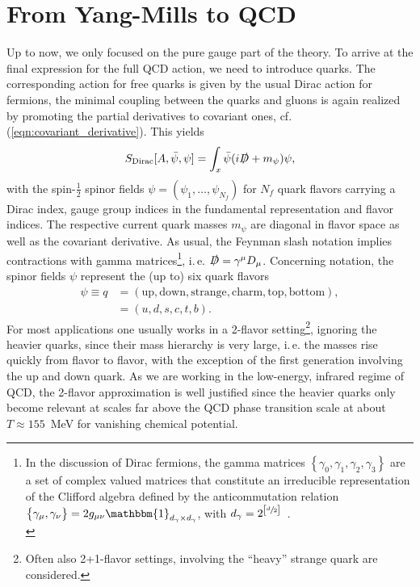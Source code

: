 \section{From Yang-Mills to QCD}\label{sec:ym_to_qcd}
Up to now, we only focused on the pure gauge part of the theory. To arrive at the final expression for the full QCD action, we need to introduce quarks. The corresponding action for free quarks is given by the usual Dirac action for fermions, the minimal coupling between the quarks and gluons is again realized by promoting the partial derivatives to covariant ones, cf. (\ref{eqn:covariant_derivative}). This yields
\begin{equation}
S_{\mathrm{Dirac}}[A,\bar{\psi},\psi]=\int_x \bar{\psi}(i\slashed{D} + m_{\psi}) \psi,
\end{equation}
with the spin-$\frac{1}{2}$ spinor fields $\psi = (\psi_1, \dots, \psi_{N_f})$ for $N_f$ quark flavors carrying a Dirac index, gauge group indices in the fundamental representation and flavor indices. The respective current quark masses $m_{\psi}$ are diagonal in flavor space as well as the covariant derivative. As usual, the Feynman slash notation implies contractions with gamma matrices\footnote{In the discussion of Dirac fermions, the gamma matrices $\left\{\gamma_0, \gamma_1, \gamma_2, \gamma_3\right\}$ are a set of complex valued matrices that constitute an irreducible representation of the Clifford algebra  defined by the anticommutation relation $\left\{\gamma_{\mu}, \gamma_{\nu}\right\}= 2g_{\mu\nu} \mathbbm{1}_{d_{\gamma}\times d_{\gamma}}$, with $d_{\gamma} = 2^{\left[\sfrac{d}{2}\right]}$\ \cite{PeskinSchroeder1995}.\\}, i.\,e. $\slashed{D} = \gamma^{\mu}D_{\mu}$.
 Concerning notation, the spinor fields $\psi$ represent the (up to) six quark flavors 
  \begin{equation}
  \begin{aligned}
 	\psi \equiv q &= \left(\text{up}, \text{down}, \text{strange}, \text{charm}, \text{top}, \text{bottom}\right), \\
 	&= \left(u, d, s, c, t, b\right).
 	 \end{aligned}
 \end{equation}
For most applications one usually works in a 2-flavor setting\footnote{Often also 2+1-flavor settings, involving the \enquote{heavy} strange quark are considered.}, ignoring the heavier quarks, since their mass hierarchy is very large, i.\,e. the masses rise quickly from flavor to flavor, with the exception of the first generation involving the up and down quark. As we are working in the low-energy, infrared regime of QCD, the 2-flavor approximation is well justified since the heavier quarks only become relevant at scales far above the QCD phase transition scale at about $T\approx 155$\ MeV for vanishing chemical potential. \\
